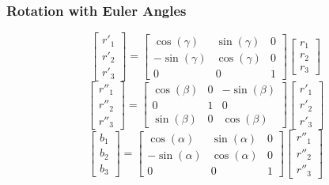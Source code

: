 \documentclass[11pt]{beamer}
\begin{document}
    \begin{frame}
        \frametitle{Rotation with Euler Angles}\label{subsec:rotationWithEulerAngles}
        \begin{equation}
            \begin{bmatrix}
                r'_1 \\
                r'_2 \\
                r'_3
            \end{bmatrix}
            =
            \begin{bmatrix}
                \cos(\gamma) & \sin(\gamma) & 0 \\
                -\sin(\gamma) & \cos(\gamma) & 0 \\
                0 & 0 & 1
            \end{bmatrix}
            \begin{bmatrix}
                r_1 \\
                r_2 \\
                r_3
            \end{bmatrix}
        \end{equation}
        \begin{equation}
            \begin{bmatrix}
                r''_1 \\
                r''_2 \\
                r''_3 
            \end{bmatrix}
            =
            \begin{bmatrix}
                \cos(\beta) & 0 & -\sin(\beta) \\
                0 & 1 & 0 \\
                \sin(\beta) & 0 & \cos(\beta)
            \end{bmatrix}
            \begin{bmatrix}
                r'_1 \\
                r'_2 \\
                r'_3
            \end{bmatrix}
        \end{equation}
        \begin{equation}
            \begin{bmatrix}
                b_1 \\
                b_2 \\
                b_3
            \end{bmatrix}
            =
            \begin{bmatrix}
                \cos(\alpha) & \sin(\alpha) & 0 \\
                -\sin(\alpha) & \cos(\alpha) & 0 \\
                0 & 0 & 1
            \end{bmatrix}
            \begin{bmatrix}
                r''_1 \\
                r''_2 \\
                r''_3
            \end{bmatrix}
        \end{equation}
    \end{frame}
\end{document}
